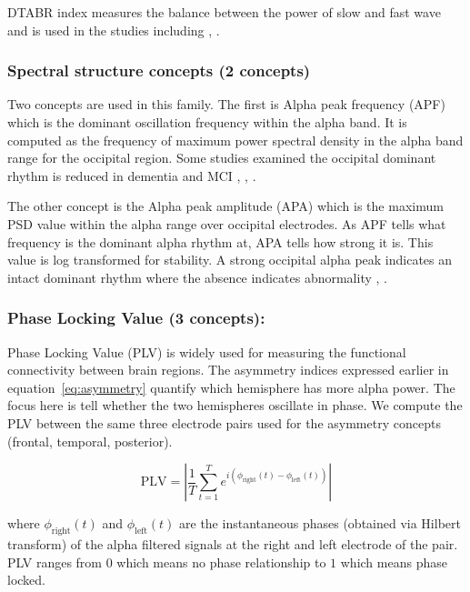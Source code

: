 \documentclass[journal,twoside,web]{ieeecolor}
\begin{document}
DTABR index measures the balance between the power of slow and fast wave and is used in the studies including \cite{olivia2024qeeg}, \cite{hussain2022quantitative}. 


\subsubsection{Spectral structure concepts (2 concepts)}
\hfill \break
Two concepts are used in this family. The first is Alpha peak frequency (APF) which is the dominant oscillation frequency within the alpha band. It is computed as the frequency of maximum power spectral density in the alpha band range for the occipital region. Some studies examined the occipital dominant rhythm is reduced in dementia and MCI \cite{klimesch1999}, \cite{radwan2025frequency}, \cite{tawhid2024exploring}.


The other concept is the Alpha peak amplitude (APA) which is the maximum PSD value within the alpha range over occipital electrodes. As APF tells what frequency is the dominant alpha rhythm at, APA tells how strong it is. This value is log transformed for stability. A strong occipital alpha peak indicates an intact dominant rhythm where the absence indicates abnormality \cite{labonte2023posterior}, \cite{olejarczyk2017eeg}.


\subsubsection{Phase Locking Value (3 concepts):}
\hfill \break

Phase Locking Value (PLV) is widely used for measuring the functional connectivity between brain regions. The asymmetry indices expressed earlier in equation~\ref{eq:asymmetry} quantify which hemisphere has more alpha power. The focus here is tell whether the two hemispheres oscillate in phase. We compute the PLV between the same three electrode pairs used for the asymmetry concepts (frontal, temporal, posterior).

\begin{equation}
  \mathrm{PLV} = \left| \frac{1}{T}\sum_{t=1}^{T} e^{i(\phi_\text{right}(t) - \phi_\text{left}(t))} \right|
  \label{eq:plv}
\end{equation}

where $\phi_\text{right}(t)$ and $\phi_\text{left}(t)$ are the instantaneous phases (obtained via Hilbert transform) of the alpha filtered signals at the right and left electrode of the pair. PLV ranges from $0$ which means no phase relationship to $1$ which means phase locked.
\end{document}
